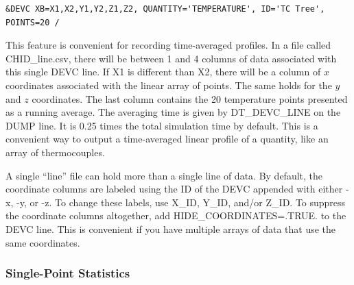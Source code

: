 \documentclass[11pt]{book}
\begin{document}
\begin{lstlisting}
&DEVC XB=X1,X2,Y1,Y2,Z1,Z2, QUANTITY='TEMPERATURE', ID='TC Tree', POINTS=20 /
\end{lstlisting}

\noindent This feature is convenient for recording time-averaged profiles.
In a file called {\ct CHID\_line.csv}, there will be between 1 and 4 columns of data associated with this single {\ct DEVC} line. If {\ct X1} is
different than {\ct X2}, there will be a column of $x$ coordinates associated with the linear array of points. The same holds for the $y$ and
$z$ coordinates. The last column contains the 20 temperature points presented as a running average. The
averaging time is given by {\ct DT\_DEVC\_LINE} on the {\ct DUMP} line. It is 0.25 times the total simulation time by default. This is a convenient
way to output a time-averaged linear profile of a quantity, like an array of thermocouples.

A single ``line'' file can hold more than a single line of data. By default, the coordinate columns are labeled using the {\ct ID} of the {\ct DEVC} appended with
either {\ct -x}, {\ct -y}, or {\ct -z}. To change these labels, use {\ct X\_ID}, {\ct Y\_ID}, and/or {\ct Z\_ID}. To suppress the coordinate columns altogether, add
{\ct HIDE\_COORDINATES=.TRUE.} to the {\ct DEVC} line. This is convenient if you have multiple arrays of data that use the same coordinates.

\subsubsection{Single-Point Statistics}
\end{document}
